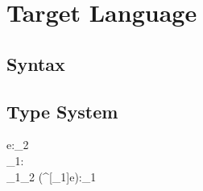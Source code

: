 














\newpage{}

\section{Target Language}

\subsection{Syntax}

\subsection{Type System}

 {\Gamma\vdash{}e:\tau_2 \\ \Gamma\vdash\tau_1:\star
\\ \tau_1\longrightarrow\tau_2} {\Gamma\vdash(^{\uparrow}[\tau_1]e):\tau_1}

